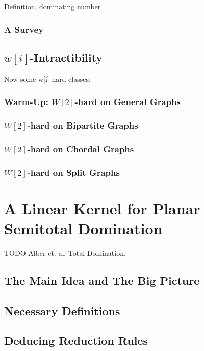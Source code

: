 Definition, dominating number

\subsection*{A Survey}

\section{\hmath $w[i]$-Intractibility}

Now some  w[i] hard classes. 

\subsection{Warm-Up: \hmath $W[2]$-hard on General Graphs}

\subsection{\hmath $W[2]$-hard on Bipartite Graphs}

\subsection{\hmath $W[2]$-hard on Chordal Graphs}

\subsection{\hmath $W[2]$-hard on Split Graphs}

\chapter{A Linear Kernel for Planar Semitotal Domination}

TODO Alber et. al, Total Domination. 

\section{The Main Idea and The Big Picture}
\section{Necessary Definitions}

\section{Deducing Reduction Rules}
